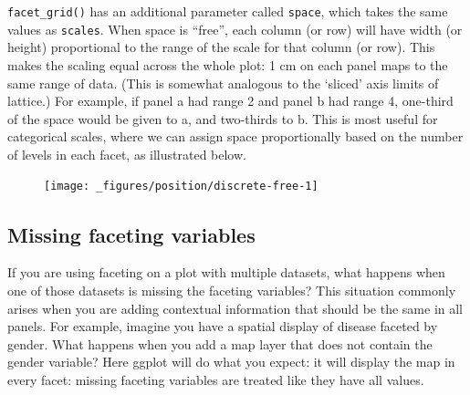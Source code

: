 \texttt{facet\_grid()} has an additional parameter called
\texttt{space}, which takes the same values as \texttt{scales}. When
space is ``free'', each column (or row) will have width (or height)
proportional to the range of the scale for that column (or row). This
makes the scaling equal across the whole plot: 1 cm on each panel maps
to the same range of data. (This is somewhat analogous to the `sliced'
axis limits of lattice.) For example, if panel a had range 2 and panel b
had range 4, one-third of the space would be given to a, and two-thirds
to b. This is most useful for categorical scales, where we can assign
space proportionally based on the number of levels in each facet, as
illustrated below.

\begin{Shaded}
\begin{Highlighting}[]
\StringTok{ }
\StringTok{ }
\StringTok{ }
\StringTok{  }\NormalTok{() +}\StringTok{ }
\StringTok{  }\StringTok{ } \NormalTok{, } \NormalTok{) +}
\StringTok{  }\NormalTok{(} \NormalTok{(} \NormalTok{))}
\end{Highlighting}
\end{Shaded}

\begin{figure}[H]
  \centering
  \texttt{[image: \_figures/position/discrete-free-1]}
\end{figure}

\subsection{Missing faceting
variables}\label{sub:missing-faceting-columns}

If you are using faceting on a plot with multiple datasets, what happens
when one of those datasets is missing the faceting variables? This
situation commonly arises when you are adding contextual information
that should be the same in all panels. For example, imagine you have a
spatial display of disease faceted by gender. What happens when you add
a map layer that does not contain the gender variable? Here ggplot will
do what you expect: it will display the map in every facet: missing
faceting variables are treated like they have all values.

